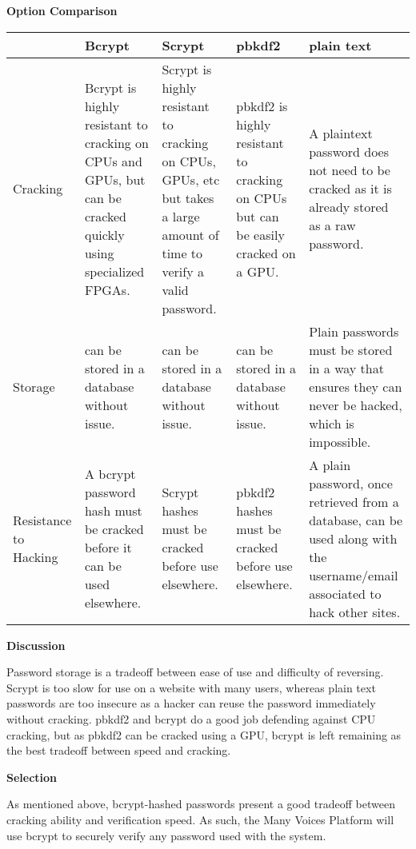 \documentclass[letterpaper, 10pt, draftclsnofoot, compsoc, onecolumn]{IEEEtran}
\begin{document}
{{ \par}


\newpage
{\noindent\rmfamily\bfseries\color{black} Option Comparison \par}
\vspace{1pc}
\tablehead{}
\begin{supertabular}{|p{2cm}|p{2.5cm}|p{2.5cm}|p{2.5cm}|p{2.5cm}|}
\hline
  & Bcrypt
  & Scrypt
  & pbkdf2
  & plain text \\ \hline
Cracking
  & Bcrypt is highly resistant to cracking on CPUs and GPUs, but can be cracked quickly using specialized FPGAs.
  & Scrypt is highly resistant to cracking on CPUs, GPUs, etc but takes a large amount of time to verify a valid password.
  & pbkdf2 is highly resistant to cracking on CPUs but can be easily cracked on a GPU.
  & A plaintext password does not need to be cracked as it is already stored as a raw password. \\ \hline
Storage
  & can be stored in a database without issue.
  & can be stored in a database without issue.
  & can be stored in a database without issue.
  & Plain passwords must be stored in a way that ensures they can never be hacked, which is impossible. \\ \hline
Resistance to Hacking
  & A bcrypt password hash must be cracked before it can be used elsewhere.
  & Scrypt hashes must be cracked before use elsewhere.
  & pbkdf2 hashes must be cracked before use elsewhere.
  & A plain password, once retrieved from a database, can be used along with the username/email associated to hack other sites. \\ \hline
\end{supertabular}

{\noindent\rmfamily\bfseries\color{black} Discussion \par}
{\noindent
Password storage is a tradeoff between ease of use and difficulty of reversing. Scrypt is too slow for use on a website with many users,
whereas plain text passwords are too insecure as a hacker can reuse the password immediately without cracking. pbkdf2 and bcrypt do a good
job defending against CPU cracking, but as pbkdf2 can be cracked using a GPU, bcrypt is left remaining as the best tradeoff between speed and
cracking.
 \par}

\medskip
{\noindent\rmfamily\bfseries\color{black} Selection \par}
{\noindent
As mentioned above, bcrypt-hashed passwords present a good tradeoff between cracking ability and verification speed.
As such, the Many Voices Platform will use bcrypt to securely verify any password used with the system.
\par}

}
\end{document}
